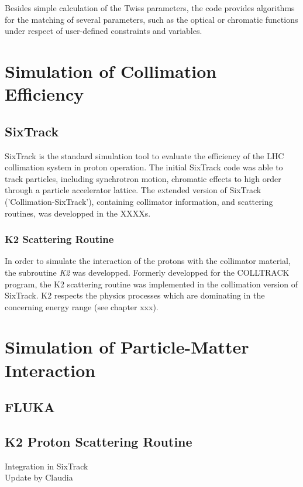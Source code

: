 Besides simple calculation of the Twiss parameters, the code provides algorithms for the matching of several parameters, such as the optical or chromatic functions under respect of user-defined constraints and variables. 

\section{Simulation of Collimation Efficiency}
\subsection{SixTrack}
SixTrack is the standard simulation tool to evaluate the efficiency of the LHC collimation system in proton operation. The initial SixTrack code was able to track particles, including synchrotron motion, chromatic effects to high order through a particle accelerator lattice. The extended version of SixTrack ('Collimation-SixTrack'), containing collimator information, and scattering routines, was developped in the XXXXs. 

\subsubsection{K2 Scattering Routine}
In order to simulate the interaction of the protons with the collimator material, the subroutine \textit{K2} was developped. Formerly developped for the COLLTRACK program, the K2 scattering routine was implemented in the collimation version of SixTrack. K2 respects the physics processes which are dominating in the concerning energy range (see chapter xxx).



\section{Simulation of Particle-Matter Interaction}
\subsection{FLUKA}



\subsection{K2 Proton Scattering Routine}

Integration in SixTrack \\
Update by Claudia